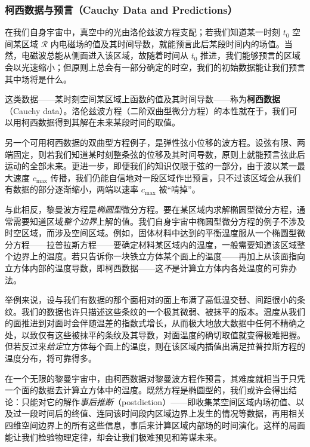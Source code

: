 \subsubsection{柯西数据与预言（Cauchy Data and Predictions）}

在我们自身宇宙中，真空中的光由洛伦兹波方程支配；若我们知道某一时刻 $t_{0}$ 空间某区域 $\mathcal{R}$ 内电磁场的值及其时间导数，就能预言此后某段时间内的场值。当然，电磁波总能从侧面进入该区域，故随着时间从 $t_{0}$ 推进，我们能够预言的区域会以光速缩小；但原则上总会有一部分确定的时空，我们的初始数据能让我们预言其中场将是什么。

这类数据——某时刻空间某区域上函数的值及其时间导数——称为\textbf{柯西数据}（Cauchy data）。洛伦兹波方程（二阶双曲型微分方程）的本性就在于，我们可以用柯西数据得到其解在未来某段时间的取值。

另一个可用柯西数据的双曲型方程例子，是弹性弦小位移的波方程。设弦有限、两端固定，则若我们知道某时刻整条弦的位移及其时间导数，原则上就能预言弦此后运动的全部未来。更进一步，即便我们的知识仅限于弦的一部分，由于波以某一最大速度 $c_{\max}$ 传播，我们仍能自信地对一段区域作出预言，只不过该区域会从我们有数据的部分逐渐缩小，两端以速率 $c_{\max}$ 被“啃掉”。

与此相反，黎曼波方程是\emph{椭圆型}微分方程。要在某区域内求解椭圆型微分方程，通常需要知道区域\emph{整个边界}上解的值。我们自身宇宙中椭圆型微分方程的例子不涉及时空区域，而涉及空间区域。例如，固体材料中达到的平衡温度服从一个椭圆型微分方程——拉普拉斯方程——要确定材料某区域内的温度，一般需要知道该区域整个边界上的温度。若只告诉你一块铁立方体某个面上的温度——再加上从该面指向立方体内部的温度导数，即柯西数据——这\emph{不}是计算立方体内各处温度的可靠办法。

举例来说，设与我们有数据的那个面相对的面上布满了高低温交替、间距很小的条纹。我们的数据也许只描述这些条纹的一个极其微弱、被抹平的版本。温度从我们的面推进到对面时会伴随温差的指数式增长，从而极大地放大数据中任何不精确之处，以致仅有这些被抹平的条纹及其导数，对面温度的确切取值就变得极难把握。但若反过来\emph{给定}立方体每个面上的温度，则在该区域内插值出满足拉普拉斯方程的温度分布，将可靠得多。

在一个无限的黎曼宇宙中，由柯西数据对黎曼波方程作预言，其难度就相当于只凭一个面的数据去计算立方体中的温度。既然方程是椭圆型的，我们或许会得出结论：只能对它的解作\emph{事后推断}（postdiction）——即收集某空间区域内场初值、以及过一段时间后的终值、连同该时间段内区域边界上发生的情况等数据，再用相关四维空间边界上的所有这些信息，事后来计算区域内部场的时间演化。这样的局面能让我们检验物理定律，却会让我们极难预见和筹谋未来。


